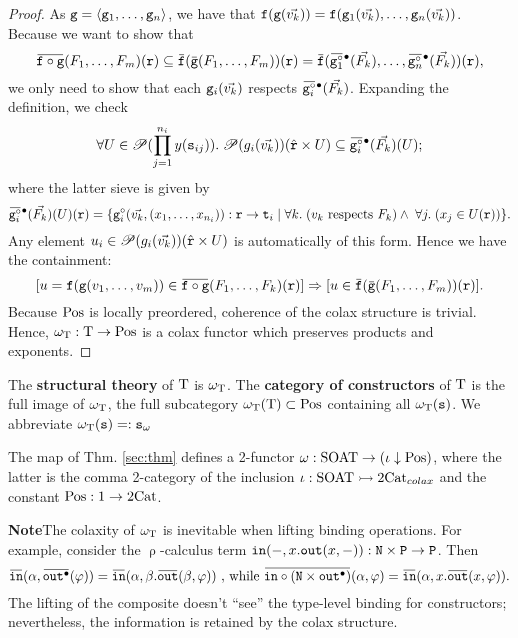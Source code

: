 \documentclass[stthol.tex]{subfiles}
\begin{document}
\begin{proof}
  As $\mathtt{g} = \langle \mathtt{g}_1,\dots,\mathtt{g}_n\rangle$, we have that $\mathtt{f}(\mathtt{g}(\vec{v_k}))=\mathtt{f}(\mathtt{g}_1(\vec{v_k}),\dots,\mathtt{g}_n(\vec{v_k}))$. Because we want to show that
  $$\ob{\ttf\circ\ttg}(F_1,\dots,F_m)(\ttrr)\subseteq \ob{\ttf}(\ob{\ttg}(F_1,\dots,F_m))(\ttrr)=\ob{\ttf}(\ob{\ttg_1^\circ}^\bullet(\vec{F_k}),\dots,\ob{\ttg_n^\circ}^\bullet(\vec{F_k}))(\ttrr),$$
  we only need to show that each $\mathtt{g}_i(\vec{v_k})$ respects $\ob{\ttg_i^\circ}^\bullet(\vec{F_k})$. Expanding the definition, we check
  $$\forall U\in \pow(\prod_{j=1}^{n_i}y(\tts_{ij})).\; \pow(g_i(\vec{v_k}))(\hat{\ttrr}\times U)\subseteq \ob{\ttg_i^\circ}^\bullet(\vec{F_k})(U);$$
  where the latter sieve is given by
  $$\ob{\ttg_i^\circ}^\bullet(\vec{F_k})(U)(\ttrr) = \{\ttg_i^\circ(\vec{v_k},(x_1,\dots,x_{n_i})):\ttrr\to \ttt_i\; |\; \forall k.\; (v_k \text{ respects } F_k) \land\; \forall j.\; (x_j\in U(\ttrr))\}.$$
  Any element $u_i\in\mathscr{P}(g_i(\vec{v_k}))(\hat{\mathtt{r}}\times U)$ is automatically of this form. Hence we have the containment:
  $$[u=\ttf(\ttg(v_1,\dots,v_m))\in \ob{\ttf\circ\ttg}(F_1,\dots,F_k)(\ttrr)] \Rightarrow [u\in \ob{\ttf}(\ob{\ttg}(F_1,\dots,F_m))(\ttrr)].$$
  Because $\mathrm{Pos}$ is locally preordered, coherence of the colax structure is trivial. Hence, $\omega_{\mathrm{T}}:\mathrm{T}\to \mathrm{Pos}$ is a colax functor which preserves products and exponents.
\end{proof}

\begin{definition}
  The \textbf{structural theory} of $\mathrm{T}$ is $\omega_{\mathrm{T}}$. The \textbf{category of constructors} of $\mathrm{T}$ is the full image of $\omega_{\mathrm{T}}$, the full subcategory $\omega_{\mathrm{T}}(\mathrm{T})\subset\mathrm{Pos}$ containing all $\omega_{\mathrm{T}}(\mathtt{s})$. We abbreviate $\omega_{\mathrm{T}}(\mathtt{s})=: \mathtt{s}_\omega$
\end{definition}

\begin{theorem}
\label{sec:thm2}
  The map of Thm. \ref{sec:thm} defines a 2-functor $\omega:\mathrm{SOAT}\to (\iota\downarrow \mathrm{Pos})$, where the latter is the comma 2-category of the inclusion $\iota:\mathrm{SOAT}\rightarrowtail\mathrm{2Cat}_{colax}$ and the constant $\mathrm{Pos}:1\to \mathrm{2Cat}$.
\end{theorem}

\textbf{Note}\quad The colaxity of $\omega_{\mathrm{T}}$ is inevitable when lifting binding operations. For example, consider the $\uprho$-calculus term $\mathtt{in}(-,x.\mathtt{out}(x,-)):\mathtt{N}\times \mathtt{P}\to \mathtt{P}$. Then
$$\ob{\tti}(\alpha,\ob{\tto^\bullet}(\varphi)) = \ob{\tti}(\alpha,\beta.\ob{\tto}(\beta,\varphi))\text{ , while }\ob{\tti\circ (\N\times \tto^\bullet)}(\alpha,\varphi) = \ob{\tti}(\alpha,x.\ob{\tto}(x,\varphi)).$$
The lifting of the composite doesn't ``see'' the type-level binding for  constructors; nevertheless, the information is retained by the colax structure.
\end{document}
